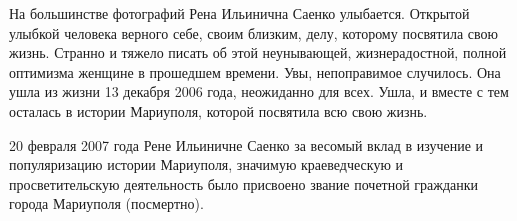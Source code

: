 На большинстве фотографий Рена Ильинична Саенко улыбается. Открытой улыбкой
человека верного себе, своим близким, делу, которому посвятила свою жизнь.
Странно и тяжело писать об этой неунывающей, жизнерадостной, полной оптимизма
женщине в прошедшем времени. Увы, непоправимое случилось. Она ушла из жизни 13
декабря 2006 года, неожиданно для всех. Ушла, и вместе с тем осталась в истории
Мариуполя, которой посвятила всю свою жизнь.

20 февраля 2007 года Рене Ильиничне Саенко за весомый вклад в изучение и
популяризацию истории Мариуполя, значимую краеведческую и просветительскую
деятельность было присвоено звание почетной гражданки города Мариуполя
(посмертно).
